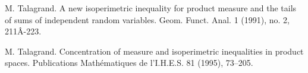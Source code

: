 \documentclass[reqno,12pt]{amsart}
\theoremstyle{plain}
\begin{document}
\begin{thebibliography}{BH3}
\vskip2mm
M. Talagrand. A new isoperimetric inequality for product measure and the 
        tails of sums of independent random variables. Geom. Funct. Anal.  
        1  (1991),  no. 2, 211Â-223. 

\vskip2mm
M. Talagrand. Concentration of measure and isoperimetric inequalities in
         product spaces. Publications Math\'ematiques
         de l'I.H.E.S. 81 (1995), 73--205.

\end{thebibliography}
\end{document}
